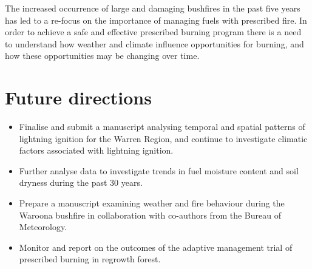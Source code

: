 \documentclass[version=last,
    paper=a4, %
    10pt, %
    usenames,
    dvipsnames,
    oneside, %
    headings=openany, %
    DIV=15 %
]{scrbook}
\begin{document}
The increased occurrence of large and damaging bushfires in the past
five years has led to a re-focus on the importance of managing fuels
with prescribed fire. In order to achieve a safe and effective
prescribed burning program there is a need to understand how weather and
climate influence opportunities for burning, and how these opportunities
may be changing over time.



\section*{Future directions}
\begin{itemize}
\itemsep1pt\parskip0pt
\item
  Finalise and submit a manuscript analysing temporal and spatial
  patterns of lightning ignition for the Warren Region, and continue to
  investigate climatic factors associated with lightning ignition.
\item
  Further analyse data to investigate trends in fuel moisture content
  and soil dryness during the past 30 years.
\item
  Prepare a manuscript examining weather and fire behaviour during the
  Waroona bushfire in collaboration with co-authors from the Bureau of
  Meteorology.
\item
  Monitor and report on the outcomes of the adaptive management trial of
  prescribed burning in regrowth forest.
\end{itemize}



\end{document}
